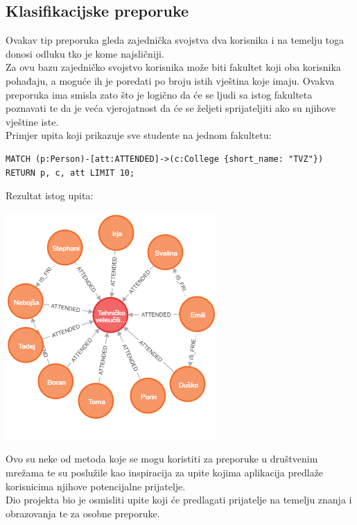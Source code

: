 \documentclass[titlepage, 12pt]{scrartcl}
\begin{document}
\subsection*{Klasifikacijske preporuke}
Ovakav tip preporuka gleda zajednička svojstva dva korisnika i na temelju toga donosi odluku tko je kome najsličniji. \\
Za ovu bazu zajedničko svojstvo korisnika može biti fakultet koji oba korisnika pohađaju, a moguće ih je poredati po broju istih vještina koje imaju. Ovakva preporuka ima smisla zato što je logično da će se ljudi sa istog fakulteta poznavati te da je veća vjerojatnost da će se željeti sprijateljiti ako su njihove vještine iste. \\
\newpage
Primjer upita koji prikazuje sve studente na jednom fakultetu:

\begin{samepage}
\begin{verbatim}
MATCH (p:Person)-[att:ATTENDED]->(c:College {short_name: "TVZ"})
RETURN p, c, att LIMIT 10;
\end{verbatim}
\end{samepage}

Rezultat istog upita:
\begin{center}
    \includegraphics[scale=0.7]{slike/same_college.png}
\end{center}

Ovo su neke od metoda koje se mogu koristiti za preporuke u društvenim mrežama te su poslužile kao inspiracija za upite kojima aplikacija predlaže korisnicima njihove potencijalne prijatelje. \\
Dio projekta bio je osmisliti upite koji će predlagati prijatelje na temelju znanja i obrazovanja te za osobne preporuke.
\end{document}
